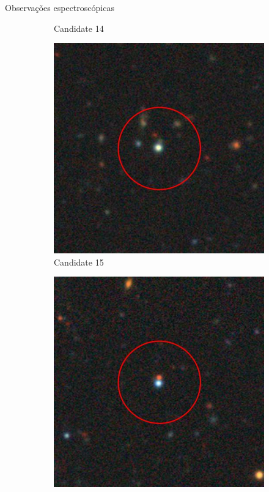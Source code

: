 \begin{frame}[c]{Observações espectroscópicas}
\begin{figure}
\begin{subfigure}[b]{0.11\textwidth}
        \caption{Candidate 14}
    \end{subfigure}
    \begin{subfigure}[b]{0.11\textwidth}
        \includegraphics[width=\textwidth]{images/proposatal_candidatas_1/UCG15.jpg}
        \caption{Candidate 15}
    \end{subfigure}
    \begin{subfigure}[b]{0.11\textwidth}
        \includegraphics[width=\textwidth]{images/proposatal_candidatas_1/UCG16.jpg}

\end{subfigure}
\end{figure}
\end{frame}
